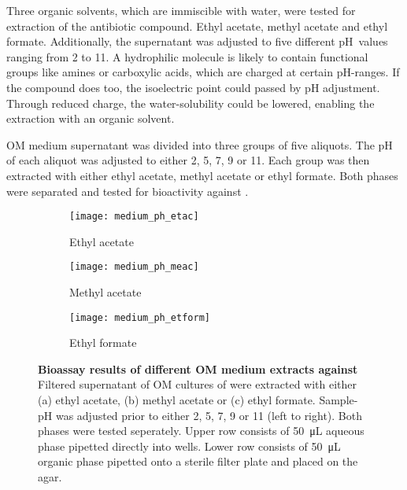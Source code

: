 	Three organic solvents, which are immiscible with water, were tested for extraction of the antibiotic compound.
	Ethyl acetate, methyl acetate and ethyl formate. Additionally, the supernatant was adjusted to five different pH~values ranging from 2 to 11.
	A hydrophilic molecule is likely to contain functional groups like amines or carboxylic acids, which are charged at certain pH-ranges.
	If the compound does too, the isoelectric point could passed by pH adjustment.
	Through reduced charge, the water-solubility could be lowered, enabling the extraction with an organic solvent.
	
	OM medium supernatant was divided into three groups of five aliquots.
	The pH of each aliquot was adjusted to either 2, 5, 7, 9 or 11.
	Each group was then extracted with either ethyl acetate, methyl acetate or ethyl formate.
	Both phases were separated and tested for bioactivity against \coli. 
	
	\begin{figure}[htbp]
		\centering
		\begin{subfigure}{\textwidth}
			\texttt{[image: medium\_ph\_etac]}
			\caption{Ethyl acetate}
		\end{subfigure}
		\begin{subfigure}{\textwidth}
			\texttt{[image: medium\_ph\_meac]}
			\caption{Methyl acetate}
		\end{subfigure}
		\begin{subfigure}{\textwidth}
			\texttt{[image: medium\_ph\_etform]}
			\caption{Ethyl formate}
		\end{subfigure}
		\caption[Bioassay results of different OM medium extracts against \coli]{%
			\textbf{Bioassay results of different OM medium extracts against \coli}
			Filtered supernatant of OM cultures of \tue were extracted with either (a) ethyl acetate, (b) methyl acetate or (c) ethyl formate.
			Sample-pH was adjusted prior to either 2, 5, 7, 9 or 11 (left to right).
			Both phases were tested seperately.
			Upper row consists of \SI{50}{\micro\liter} aqueous phase pipetted directly into wells.
			Lower row consists of \SI{50}{\micro\liter} organic phase pipetted onto a sterile filter plate and placed on the agar.}
		\label{fig:results_extraction_bioassay}
	\end{figure}
	
	
